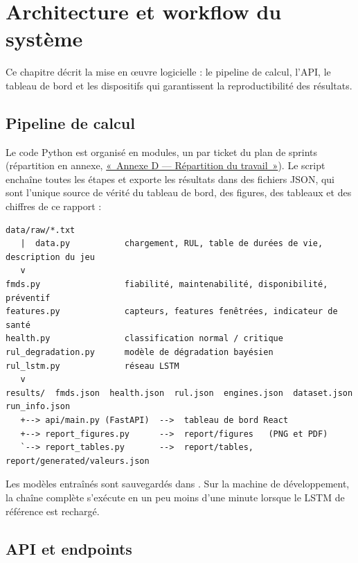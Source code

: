 \chapter{Architecture et workflow du système}\label{sec:architecture}

\chapintro

Ce chapitre décrit la mise en œuvre logicielle : le pipeline de calcul, l'API, le tableau de bord et les dispositifs qui garantissent la reproductibilité des résultats.

\section{Pipeline de calcul}\label{sec:pipeline}

Le code Python est organisé en modules, un par ticket du plan de sprints (répartition en annexe, \hyperref[sec:annexe-repartition]{«~Annexe D — Répartition du travail~»}). Le script  enchaîne toutes les étapes et exporte les résultats dans des fichiers JSON, qui sont l'unique source de vérité du tableau de bord, des figures, des tableaux et des chiffres de ce rapport :

\begin{verbatim}
data/raw/*.txt
   |  data.py           chargement, RUL, table de durées de vie, description du jeu
   v
fmds.py                 fiabilité, maintenabilité, disponibilité, préventif
features.py             capteurs, features fenêtrées, indicateur de santé
health.py               classification normal / critique
rul_degradation.py      modèle de dégradation bayésien
rul_lstm.py             réseau LSTM
   v
results/  fmds.json  health.json  rul.json  engines.json  dataset.json  run_info.json
   +--> api/main.py (FastAPI)  -->  tableau de bord React
   +--> report_figures.py      -->  report/figures   (PNG et PDF)
   `--> report_tables.py       -->  report/tables, report/generated/valeurs.json
\end{verbatim}

Les modèles entraînés sont sauvegardés dans . Sur la machine de développement, la chaîne complète s'exécute en un peu moins d'une minute lorsque le LSTM de référence est rechargé.

\section{API et endpoints}\label{sec:api}

